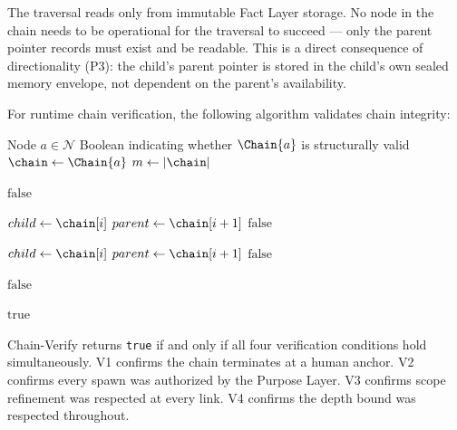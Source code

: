 The traversal reads only from immutable Fact Layer storage. No node in the chain needs to be operational for the traversal to succeed --- only the parent pointer records must exist and be readable. This is a direct consequence of directionality (P3): the child's parent pointer is stored in the child's own sealed memory envelope, not dependent on the parent's availability.

For runtime chain verification, the following algorithm validates chain integrity:

\begin{algorithm}[H]
\caption{Chain-Verify($a$)}
\label{alg:chain-verify}
\begin{algorithmic}[1]
\REQUIRE Node $a \in \mathcal{N}$
\ENSURE Boolean indicating whether $\Chain{a}$ is structurally valid
\STATE $\chain \leftarrow \Chain{a}$
\STATE $m \leftarrow |\chain|$

\STATE {}
    \STATE \RETURN $\text{false}$ 
\ENDIF

\STATE {}
    \STATE $child \leftarrow \chain[i]$
    \STATE $parent \leftarrow \chain[i+1]$
        \STATE \RETURN $\text{false}$ 
    \ENDIF
\ENDFOR

\STATE {}
    \STATE $child \leftarrow \chain[i]$
    \STATE $parent \leftarrow \chain[i+1]$
        \STATE \RETURN $\text{false}$ 
    \ENDIF
\ENDFOR

\STATE {}
        \STATE \RETURN $\text{false}$ 
    \ENDIF
\ENDFOR

\RETURN $\text{true}$
\end{algorithmic}
\end{algorithm}

Chain-Verify returns \texttt{true} if and only if all four verification conditions hold simultaneously. V1 confirms the chain terminates at a human anchor. V2 confirms every spawn was authorized by the Purpose Layer. V3 confirms scope refinement was respected at every link. V4 confirms the depth bound was respected throughout.

